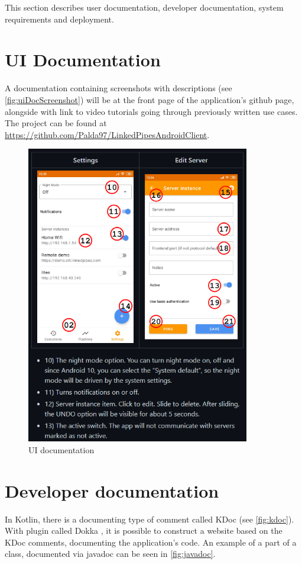 This section describes user documentation, developer documentation, system requirements and deployment.

\section{UI Documentation}
A documentation containing screenshots with descriptions (see \autoref{fig:uiDocScreenshot}) will be at the front page of the application's github page, alongside with link to video tutorials going through previously written use cases.
The project can be found at \url{https://github.com/Palda97/LinkedPipesAndroidClient}.

\begin{figure}\centering
	\includegraphics[width=0.87\textwidth]{pics/uiDocScreenshot.png}
	\caption[UI documentation]{UI documentation}\label{fig:uiDocScreenshot}
\end{figure}

\section{Developer documentation}
In Kotlin, there is a documenting type of comment called KDoc (see \autoref{fig:kdoc}).
With plugin called Dokka \cite{dokka}, it is possible to construct a website based on the KDoc comments, documenting the application's code.
An example of a part of a class, documented via javadoc can be seen in \autoref{fig:javadoc}.

